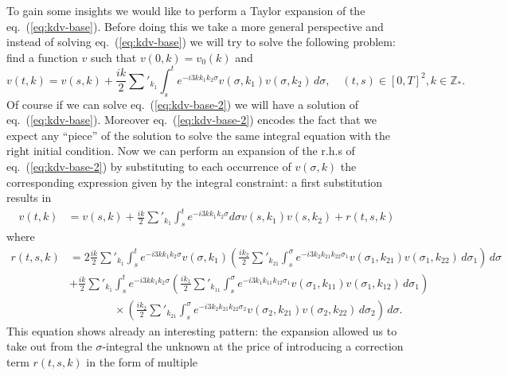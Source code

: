 \documentclass[a4paper,12pt,reqno]{article}
\newcommand{\ZZ}{\mathbb{Z}}
\begin{document}
To gain some insights we would like to perform a Taylor expansion of
the eq.~(\ref{eq:kdv-base}). Before  doing this we take a more
general perspective and instead of solving eq.~(\ref{eq:kdv-base}) we
will try to solve the following problem:
find a function $ v$ such
that $ v(0,k) =  v_0(k)$ and 
\begin{equation}
  \label{eq:kdv-base-2}
 v(t,k) =   v(s,k) + \frac{ik}2 \sum'_{k_1} \int_s^t e^{- i 3 k k_1 k_2 \sigma}
  v(\sigma,k_1)  v(\sigma,k_2) \, d\sigma, \quad (t,s) \in [0,T]^2, k \in \ZZ_*. 
\end{equation}
Of course if we can solve eq.~(\ref{eq:kdv-base-2}) we will have a
solution of eq.~(\ref{eq:kdv-base}). Moreover
eq.~(\ref{eq:kdv-base-2}) encodes the fact that we expect any ``piece''
of the solution to solve the same integral equation with the right
initial condition.
Now we can perform an expansion of the r.h.s of
eq.~(\ref{eq:kdv-base-2}) by substituting to each occurrence of $
v(\sigma,k)$ the corresponding expression given by the integral
constraint: a first substitution results in
\begin{equation}
  \label{eq:kdv-base-remainder}
  \begin{split}
 v(t,k) & =   v(s,k) + \frac{ik}2 \sum'_{k_1} \int_s^t e^{-i 3 k k_1 k_2 \sigma}
  d\sigma  v(s,k_1)  v(s,k_2)  + r(t,s,k)
  \end{split}
\end{equation}
where
\begin{equation*}
  \begin{split}
 r(t,s,k) & = 2 \frac{ik}2 \sum'_{k_1} \int_s^t e^{-i 3 k k_1 k_2 \sigma}
  v(\sigma,k_1) \left( \frac{ik_2}2 \sum'_{k_{21}} \int_s^\sigma
   e^{- i 3 k_2 k_{21} k_{22} \sigma_1}
  v(\sigma_1,k_{21})  v(\sigma_1,k_{22}) \, d\sigma_1 \right)  \, d\sigma   
\\ &   + \frac{ik}2 \sum'_{k_1} \int_s^t e^{-i 3 k k_1 k_2 \sigma}
\left( \frac{ik_1}2 \sum'_{k_{11}} \int_s^\sigma e^{-i 3 k_1 k_{11} k_{12} \sigma_1}
  v(\sigma_1,k_{11})  v(\sigma_1,k_{12}) \, d\sigma_1 \right)
\\ &\qquad \qquad  \times
\left( \frac{ik_2}2 \sum'_{k_{21}} \int_s^\sigma e^{-i 3 k_2 k_{21} k_{22} \sigma_2}
  v(\sigma_2,k_{21})  v(\sigma_2,k_{22}) \, d\sigma_2 \right)\, d\sigma.
  \end{split}
\end{equation*}
This equation shows already an interesting pattern: the expansion
allowed us to take out from the $\sigma$-integral the unknown at the
price of introducing a correction term $r(t,s,k)$ in the form of multiple
\end{document}
